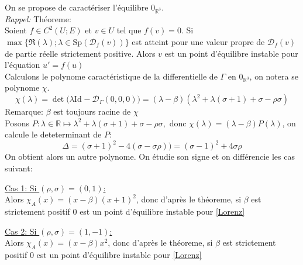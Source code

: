 \documentclass{article}
\newcommand{\R}{\mathbb{R}}
\newcommand{\id}[1][]{\ensuremath{\mathrm{Id}_{#1}}}
\begin{document}
On se propose de caractériser l'équilibre $0_{\R^3}$.\\
\textit{Rappel:} Théoreme:\\
Soient $f\in C^2(U;E)$ et $v\in U$ tel que $f(v)=0$. Si $\max\{\Re(\lambda); \lambda\in \mathrm{Sp}(\mathcal{D}_f(v))\}$ est atteint pour une valeur propre de $\mathcal{D}_f(v)$ de partie réelle strictement positive. Alors $v$ est un point d'équilibre instable pour l'équation $u'=f(u)$ \\
Calculons le polynome caractéristique de la differentielle de $\Gamma$ en $0_{\R^3}$, on notera se polynome $\chi$.
\[
    \chi (\lambda) = \det\big(\lambda\id - \mathcal{D}_{\Gamma}(0,0,0)\big) = (\lambda - \beta)(\lambda^2 + \lambda(\sigma+1)+\sigma-\rho\sigma)
\]
Remarque: $\beta$ est toujours racine de $\chi$\\
Posons $P:\lambda \in \R \mapsto \lambda^2 + \lambda(\sigma+1)+\sigma-\rho\sigma,\text{ donc }\chi(\lambda)=(\lambda-\beta)P(\lambda)$, on calcule le deteterminant de $P$:
\[
  \Delta = (\sigma+1)^2 - 4(\sigma-\sigma\rho)) = (\sigma-1)^2 +4\sigma\rho
\]
On obtient alors un autre polynome. On étudie son signe et on différencie les cas suivant:

\underline{Cas 1: Si $(\rho,\sigma)=(0,1)$:}\\
Alors $\chi_A(x) = (x-\beta)(x+1)^2$, donc d'après le théoreme, si $\beta$ est strictement positif $0$ est un point d'équilibre instable pour \eqref{Lorenz}

\underline{Cas 2: Si $(\rho,\sigma)=(1,-1)$:}\\
Alors $\chi_A(x) = (x-\beta)x^2$, donc d'après le théoreme, si $\beta$ est strictement positif $0$ est un point d'équilibre instable pour \eqref{Lorenz}
\end{document}
